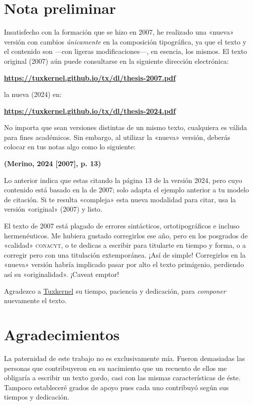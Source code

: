\documentclass[14pt,twoside,final]{extbook} %
\begin{document}
\chapter*{Nota preliminar}
\label{ch:nota-preliminar}
Insatisfecho con la formación que se hizo en 2007, he realizado una «nueva» versión con cambios \emph{únicamente} en la composición tipográfica, ya que el texto y el contenido son ---con ligeras modificaciones---, en esencia, los mismos. El texto original (2007) aún puede consultarse en la siguiente dirección electrónica:
\begin{center}
\href{https://tuxkernel.github.io/tx/dl/thesis-2007.pdf}{\bfseries https://tuxkernel.github.io/tx/dl/thesis-2007.pdf}
\end{center}
la nueva (2024) en:
\begin{center}
\href{https://tuxkernel.github.io/tx/dl/thesis-2024.pdf}{\bfseries https://tuxkernel.github.io/tx/dl/thesis-2024.pdf}
\end{center}
No importa que sean versiones distintas de un mismo texto, cualquiera es válida para fines académicos. Sin embargo, al utilizar la «nueva» versión, deberás colocar en tus notas algo como lo siguiente:
\begin{center}
\bfseries (Merino, 2024 [2007], p. 13)
\end{center}
\noindent Lo anterior indica que estas citando la página 13 de la versión 2024, pero cuyo contenido está basado en la de 2007; solo adapta el ejemplo anterior a tu modelo de citación. Si te resulta «compleja» esta nueva modalidad para citar, usa la versión «original» (2007) y listo.

El texto de 2007 está plagado de errores sintácticos, ortotipográficos e incluso hermenéuticos. Me hubiera gustado corregirlos ese año, pero en los posgrados de «calidad» \textsc{conacyt}, o te dedicas a escribir para titularte en tiempo y forma, o a corregir pero con una titulación extemporánea. ¡Así de simple! Corregirlos en la «nueva» versión habría implicado pasar por alto el texto primigenio, perdiendo así su «originalidad». ¡Caveat emptor!

Agradezco a \href{muxkernel@gmail.com}{Tuxkernel} su tiempo, paciencia y dedicación, para \emph{componer} nuevamente el texto.
\chapter*{Agradecimientos}
\label{ch:agradecimientos}
\thispagestyle{empty}
\pagestyle{fancy}
\fancyhf{} %
\fancyhead[LE,RO]{\thepage}
\renewcommand{\headrulewidth}{0pt}
La paternidad de este trabajo no es exclusivamente mía. Fueron demasiadas las personas que contribuyeron en su nacimiento que un recuento de ellos me obligaría a escribir un texto gordo, casi con las mismas características de éste. Tampoco estableceré grados de apoyo pues cada uno contribuyó según sus tiempos y dedicación.
\end{document}
